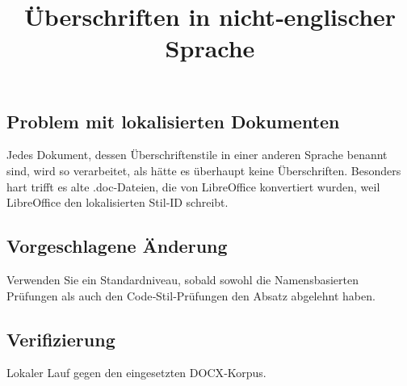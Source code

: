 \documentclass[11pt,a4paper]{article}
\title{Überschriften in nicht‑englischer Sprache}
\begin{document}
\maketitle

\subsection{Problem mit lokalisierten Dokumenten}

Jedes Dokument, dessen Überschriftenstile in einer anderen Sprache benannt sind, wird so verarbeitet, als hätte es überhaupt keine Überschriften. Besonders hart trifft es alte .doc‑Dateien, die von LibreOffice konvertiert wurden, weil LibreOffice den lokalisierten Stil‑ID schreibt.

\subsection{Vorgeschlagene Änderung}

Verwenden Sie ein Standardniveau, sobald sowohl die Namensbasierten Prüfungen als auch den Code‑Stil‑Prüfungen den Absatz abgelehnt haben.

\subsection{Verifizierung}

Lokaler Lauf gegen den eingesetzten DOCX‑Korpus.
\end{document}
